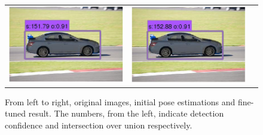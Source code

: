 \documentclass[10pt,twocolumn,letterpaper]{article}
\begin{document}
\begin{figure}[h]
\begin{tabular}{ccc}
  \includegraphics[width=0.22\linewidth]{supp/tuning_6b.png} & 
  \includegraphics[width=0.22\linewidth]{supp/tuning_6c.png}  \\
  \end{tabular}
\caption{From left to right, original images, initial pose estimations and
fine-tuned result. The numbers, from the left, indicate detection confidence
and intersection over union respectively.} 
  \label{fig:tuning}
\end{figure}


\clearpage
\clearpage
{\small


}
\end{document}
